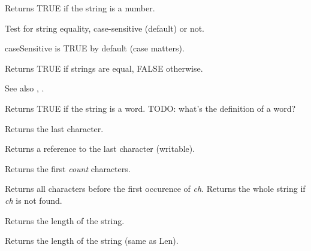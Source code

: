 \label{wxstringisnumber}


Returns TRUE if the string is a number.

\label{wxstringissameas}


Test for string equality, case-sensitive (default) or not.

caseSensitive is TRUE by default (case matters).

Returns TRUE if strings are equal, FALSE otherwise.

See also , .

\label{wxstringisword}


Returns TRUE if the string is a word. TODO: what's the definition of a word?

\label{wxstringlast}


Returns the last character.


Returns a reference to the last character (writable).

\label{wxstringleft}


Returns the first {\it count} characters.


Returns all characters before the first occurence of {\it ch}.
Returns the whole string if {\it ch} is not found.

\label{wxstringlen}


Returns the length of the string.

\label{wxstringlength}


Returns the length of the string (same as Len).

\label{wxstringlower}

